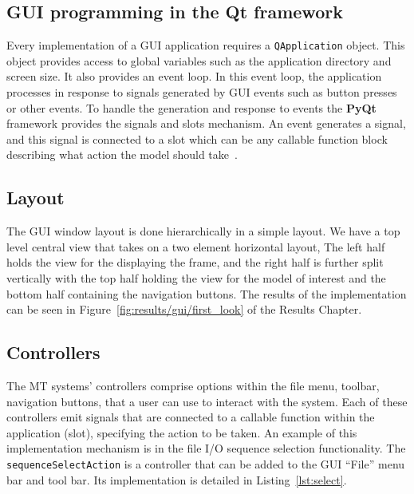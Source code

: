 \subsection{GUI programming in the Qt framework}
Every implementation of a GUI application requires a \lstinline{QApplication} object. This
object provides access to global variables such as the application directory and
screen size. It also provides an event loop. In this event loop, the application
processes in response to signals generated by GUI events such as button
presses or other events.
To handle the generation and response to events the \textbf{PyQt} framework provides the
signals and slots mechanism. An event generates a signal, and this signal is
connected to a slot which can be any callable function block describing what
action the model should take~\cite{Summerfield}.

\subsection{Layout}
The GUI window layout is done hierarchically in a simple layout. We have a top
level central view that takes on a two element horizontal layout, The left half
holds the view for the displaying the frame, and the right half is further split
vertically with the top half holding the view for the model of interest and the
bottom half containing the navigation buttons.
The results of the implementation can be seen in
Figure~\ref{fig:results/gui/first_look} of the Results Chapter.

\subsection{Controllers}
The MT systems' controllers comprise options within the file menu, toolbar,
navigation buttons, that a user can use to interact with the system. Each of
these controllers emit signals that are connected to a callable function within
the application (slot), specifying the action to be taken.
An example of this implementation mechanism is in the file I/O sequence
selection functionality. 
The \lstinline{sequenceSelectAction} is a controller that can be added to the GUI ``File'' menu
bar and tool bar. Its implementation is detailed in Listing~\ref{lst:select}. 

